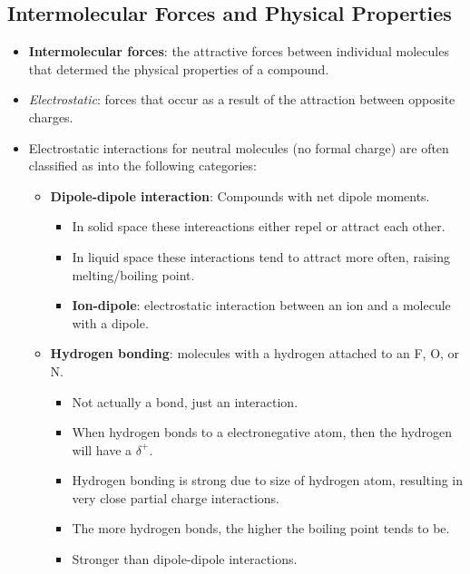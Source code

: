 \documentclass[12pt,a4paper]{article}
\begin{document}
\subsection{Intermolecular Forces and Physical Properties}
\begin{itemize}
    \item \textbf{Intermolecular forces}: the attractive forces between individual molecules that determed the physical properties of a compound.
    \item \textit{Electrostatic}: forces that occur as a result of the attraction between opposite charges. 
    \item Electrostatic interactions for neutral molecules (no formal charge) are often classified as into the following categories:
        \begin{itemize} 
            \item \textbf{Dipole-dipole interaction}: Compounds with  {\color{o-Sun}net dipole} moments. 
                \begin{itemize}
                    \item In {\color{o-Sun}solid} space these intereactions either {\color{o-Sun}repel or attract} each other.
                    \item In {\color{o-Sun}liquid} space these interactions tend to {\color{o-Sun}attract more often}, raising melting/boiling point.
                    \item \textbf{Ion-dipole}: electrostatic interaction between an ion and a molecule with a dipole.
                \end{itemize}
            \item \textbf{Hydrogen bonding}: molecules with a hydrogen attached to an F, O, or N.
                \begin{itemize}
                    \item Not actually a bond, just an interaction.
                    \item When hydrogen bonds to a electronegative atom, then the hydrogen will have a {\color{pos}$\delta^+$}.
                    \item Hydrogen bonding is strong due to size of hydrogen atom, resulting in very close partial charge interactions.
                    \item The {\color{o-Sun}more} hydrogen bonds, the {\color{o-Sun}higher} the boiling point tends to be.
                    \item Stronger than dipole-dipole interactions.
                \end{itemize}

\end{itemize}
\end{itemize}
\end{document}
